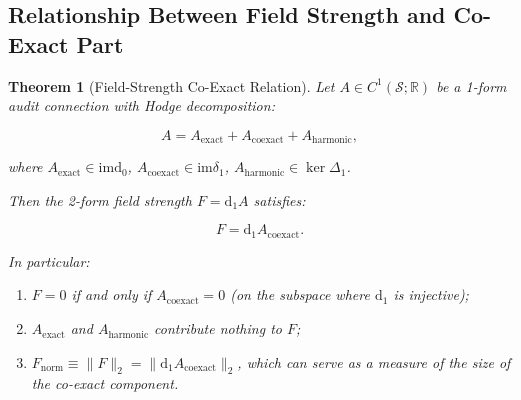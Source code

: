 \documentclass[12pt,a4paper]{article}
\theoremstyle{plain}
\newtheorem{theorem}{Theorem}
\theoremstyle{definition}
\theoremstyle{remark}
\newcommand{\R}{\mathbb{R}}
\newcommand{\im}{\mathrm{im}}
\newcommand{\dd}{\mathrm{d}}
\newcommand{\SSS}{\mathcal{S}}
\newcommand{\norm}[1]{\|#1\|}
\begin{document}
\subsection{Relationship Between Field Strength and Co-Exact Part}
\label{sec:F_coexact}

\begin{theorem}[Field-Strength Co-Exact Relation]
\label{thm:F_coexact}
Let $A \in C^1(\SSS; \R)$ be a 1-form audit connection with Hodge decomposition:

\begin{equation}\label{eq:A_hodge}
    A = A_{\mathrm{exact}} + A_{\mathrm{coexact}} + A_{\mathrm{harmonic}},
\end{equation}

where $A_{\mathrm{exact}} \in \im \dd_0$, $A_{\mathrm{coexact}} \in \im \delta_1$, $A_{\mathrm{harmonic}} \in \ker \Delta_1$.

Then the 2-form field strength $F = \dd_1 A$ satisfies:

\begin{equation}\label{eq:F_from_coexact}
    F = \dd_1 A_{\mathrm{coexact}}.
\end{equation}

In particular:
\begin{enumerate}[label=(\roman*), leftmargin=*]
    \item $F = 0$ if and only if $A_{\mathrm{coexact}} = 0$ (on the subspace where $\dd_1$ is injective);
    \item $A_{\mathrm{exact}}$ and $A_{\mathrm{harmonic}}$ contribute nothing to $F$;
    \item $F_{\mathrm{norm}} \equiv \norm{F}_2 = \norm{\dd_1 A_{\mathrm{coexact}}}_2$, which can serve as a measure of the size of the co-exact component.
\end{enumerate}
\end{theorem}
\end{document}

